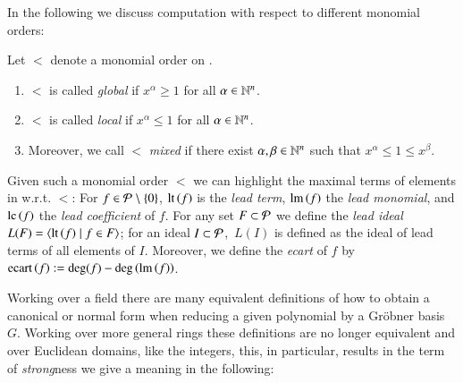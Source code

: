 In the following we discuss computation with respect to different monomial orders:
\begin{definition}
\label{def:orders}
Let $<$ denote a monomial order on \epr. 
\begin{enumerate}
\item $<$ is called \emph{global} if $x^\alpha \geq 1$ for all $\alpha \in \mathbb{N}^n$.
\item $<$ is called \emph{local} if $x^\alpha \leq 1$ for all $\alpha \in \mathbb{N}^n$.
\item Moreover, we call $<$ \emph{mixed} if there exist $\alpha, \beta \in \mathbb{N}^n$ such
that $x^\alpha \leq 1 \leq x^\beta$.
\end{enumerate}
\end{definition}
Given such a monomial order $<$ we can highlight the maximal terms of
elements in \epr w.r.t. $<$: For $f\in \mathcal{P}\ \backslash\ \{0\}$,
$\operatorname{lt}\left({f}\right)$ is the \emph{lead term}, $\operatorname{lm}\left({f}\right)$ the \emph{lead monomial}, and $\mathrm{lc}\left({f}\right)$
the \emph{lead coefficient} of $f$. For any set $F \subset \mathcal{P}$ we define
the \emph{lead ideal} $L(F) = \langle \operatorname{lt}\left({f}\right) \mid f \in F\rangle$; for an ideal
$I \subset \mathcal{P}$,\  $L(I)$ is defined as the ideal of lead terms of all elements of
$I$. Moreover, we define the \emph{ecart} of $f$ by $\mathrm{ecart}\left({f}\right) := \deg(f) -
\deg\left(\operatorname{lm}\left({f}\right)\right)$. 

Working over a field there are many equivalent definitions of how to obtain a
canonical or normal form when reducing a given polynomial by a Gr\"obner basis $G$.
Working over more general rings these definitions are no longer equivalent and
over Euclidean domains, like the integers, this, in particular, results in the term
of \emph{strong}ness we give a meaning in the following:

